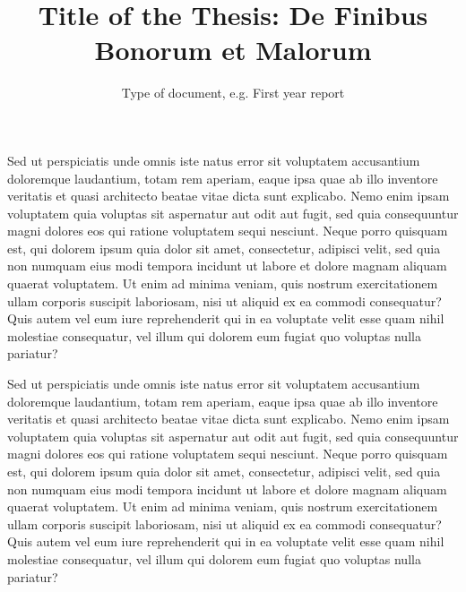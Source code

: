 \documentclass[french, english]{mythesis}
\title{Title of the Thesis: De Finibus Bonorum et Malorum}
\author{\myname{FirstName LastName}}
\date{\mydate[datestyle=short]{1970-01-01}}
\subtitle{Type of document, e.g. First year report}
\begin{document}
	\pagestyle{empty}
	
	\cleardoublepage
	\pagestyle{fancy}
	
	\mainmatter
	
	\maketitle





	\begin{myabstract}[english]

Sed ut perspiciatis unde omnis iste natus error sit voluptatem accusantium doloremque laudantium, totam rem aperiam, eaque ipsa quae ab illo inventore veritatis et quasi architecto beatae vitae dicta sunt explicabo. Nemo enim ipsam voluptatem quia voluptas sit aspernatur aut odit aut fugit, sed quia consequuntur magni dolores eos qui ratione voluptatem sequi nesciunt. Neque porro quisquam est, qui dolorem ipsum quia dolor sit amet, consectetur, adipisci velit, sed quia non numquam eius modi tempora incidunt ut labore et dolore magnam aliquam quaerat voluptatem. Ut enim ad minima veniam, quis nostrum exercitationem ullam corporis suscipit laboriosam, nisi ut aliquid ex ea commodi consequatur? Quis autem vel eum iure reprehenderit qui in ea voluptate velit esse quam nihil molestiae consequatur, vel illum qui dolorem eum fugiat quo voluptas nulla pariatur?

Sed ut perspiciatis unde omnis iste natus error sit voluptatem accusantium doloremque laudantium, totam rem aperiam, eaque ipsa quae ab illo inventore veritatis et quasi architecto beatae vitae dicta sunt explicabo. Nemo enim ipsam voluptatem quia voluptas sit aspernatur aut odit aut fugit, sed quia consequuntur magni dolores eos qui ratione voluptatem sequi nesciunt. Neque porro quisquam est, qui dolorem ipsum quia dolor sit amet, consectetur, adipisci velit, sed quia non numquam eius modi tempora incidunt ut labore et dolore magnam aliquam quaerat voluptatem. Ut enim ad minima veniam, quis nostrum exercitationem ullam corporis suscipit laboriosam, nisi ut aliquid ex ea commodi consequatur? Quis autem vel eum iure reprehenderit qui in ea voluptate velit esse quam nihil molestiae consequatur, vel illum qui dolorem eum fugiat quo voluptas nulla pariatur?

	\end{myabstract}
\end{document}
